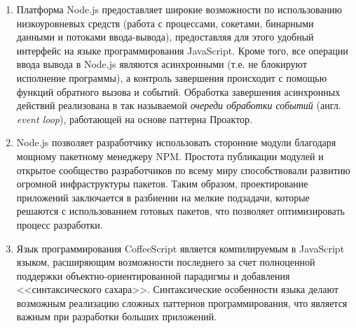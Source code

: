 \documentclass[a4paper,14pt,href]{article}
\begin{document}
\begin{enumerate}
  \item Платформа Node.js предоставляет широкие возможности по использованию низкоуровневых средств (работа с процессами, сокетами, бинарными данными и потоками ввода-вывода), предоставляя для этого удобный интерфейс на языке программирования JavaScript. Кроме того, все операции ввода вывода в Node.js являются асинхронными (т.е. не блокируют исполнение программы), а контроль завершения происходит с помощью функций обратного вызова и событий. Обработка завершения асинхронных действий реализована в так называемой \textit{очереди обработки событий} (англ. \textit{event loop})\cite{UnderstandingEvenLoop}, работающей на основе паттерна Проактор\cite{BoostProactor}.

  \item Node.js позволяет разработчику использовать сторонние модули благодаря мощному пакетному менеджеру NPM. Простота публикации модулей и открытое сообщество разработчиков по всему миру способствовали развитию огромной инфраструктуры пакетов\cite{NPMGrowth}. Таким образом, проектирование приложений заключается в разбиении на мелкие подзадачи, которые решаются с использованием готовых пакетов, что позволяет оптимизировать процесс разработки.

  \item Язык программирования CoffeeScript является компилируемым в JavaScript языком, расширяющим возможности последнего за счет полноценной поддержки объектно-ориентированной парадигмы и добавления <<синтаксического сахара>>. Синтаксические особенности языка делают возможным реализацию сложных паттернов программирования, что является важным при разработки больших приложений\cite{CoffeeScriptCookbook}.
\end{enumerate}





\newpage
{}



\end{document}
